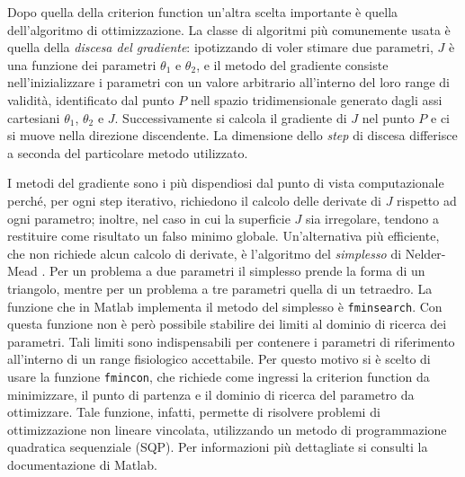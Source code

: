 Dopo quella della criterion function un'altra scelta importante è quella dell'algoritmo di ottimizzazione. La classe di algoritmi più comunemente usata è quella della \textit{discesa del gradiente}: ipotizzando di voler stimare due parametri, $J$ è una funzione dei parametri $\theta_1$ e $\theta_2$, e  il metodo del gradiente consiste nell'inizializzare i parametri con un valore arbitrario all'interno del loro range di validità, identificato dal punto $P$ nell spazio tridimensionale generato dagli assi cartesiani $\theta_1$, $\theta_2$ e $J$. Successivamente si calcola il gradiente di $J$ nel punto $P$ e ci si muove nella direzione discendente. La dimensione dello \textit{step} di discesa differisce a seconda del particolare metodo utilizzato.

I metodi del gradiente sono i più dispendiosi dal punto di vista computazionale perché, per ogni step iterativo, richiedono il calcolo delle derivate di $J$ rispetto ad ogni parametro; inoltre, nel caso in cui la superficie $J$ sia irregolare, tendono a restituire come risultato un falso minimo globale. Un'alternativa più efficiente, che non richiede alcun calcolo di derivate, è l'algoritmo del \textit{simplesso} di Nelder-Mead \cite{Nelder-Mead}. Per un problema a due parametri il simplesso prende la forma di un triangolo, mentre per un problema a tre parametri quella di un tetraedro. La funzione che in Matlab implementa il metodo del simplesso è \verb|fminsearch|. Con questa funzione non è però possibile stabilire dei limiti al dominio di ricerca dei parametri. Tali limiti sono indispensabili per contenere i parametri di riferimento all'interno di un range fisiologico accettabile. Per questo motivo si è scelto di usare la funzione \verb|fmincon|, che richiede come ingressi la criterion function da minimizzare, il punto di partenza e il dominio di ricerca del parametro da ottimizzare. Tale funzione, infatti, permette di risolvere problemi di ottimizzazione non lineare vincolata, utilizzando un metodo di programmazione quadratica sequenziale (SQP). Per informazioni più dettagliate si consulti la documentazione di Matlab.



